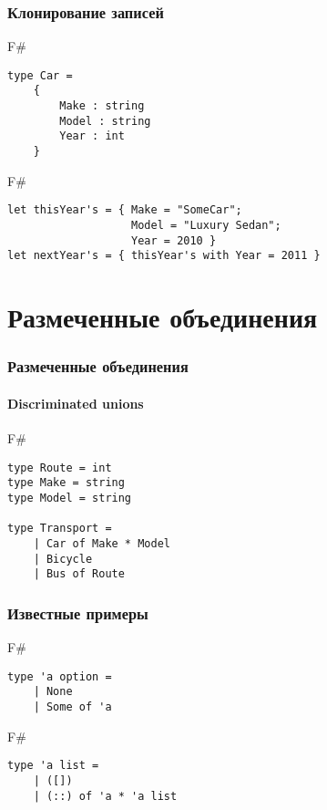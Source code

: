 \documentclass[xetex,mathserif,serif]{beamer}
\begin{document}
	\begin{frame}[fragile]
		\frametitle{Клонирование записей}
		\begin{exampleblock}{F\#}
			\begin{verbatim}
type Car =
    {
        Make : string
        Model : string
        Year : int
    }
			\end{verbatim}
		\end{exampleblock}
		
		\begin{exampleblock}{F\#}
			\begin{verbatim}
let thisYear's = { Make = "SomeCar"; 
                   Model = "Luxury Sedan"; 
                   Year = 2010 }
let nextYear's = { thisYear's with Year = 2011 }
			\end{verbatim}
		\end{exampleblock}
\end{frame}

	\section{Размеченные объединения}
	
	\begin{frame}[fragile]
		\frametitle{Размеченные объединения}
		\framesubtitle{Discriminated unions}
		\begin{exampleblock}{F\#}
			\begin{verbatim}
type Route = int
type Make = string
type Model = string

type Transport =
    | Car of Make * Model
    | Bicycle
    | Bus of Route
			\end{verbatim}
		\end{exampleblock}
\end{frame}

	\begin{frame}[fragile]
		\frametitle{Известные примеры}
		\begin{exampleblock}{F\#}
			\begin{verbatim}
type 'a option =
    | None
    | Some of 'a
			\end{verbatim}
		\end{exampleblock}

		\begin{exampleblock}{F\#}
			\begin{verbatim}
type 'a list =
    | ([])
    | (::) of 'a * 'a list
			\end{verbatim}
		\end{exampleblock}
\end{frame}
\end{document}
